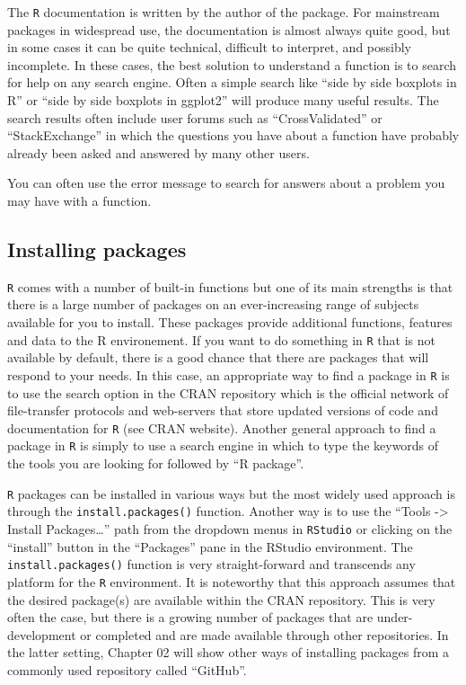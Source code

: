 \documentclass[]{book}
\theoremstyle{definition}
\theoremstyle{definition}
\theoremstyle{remark}
\let\BeginKnitrBlock\begin \let\EndKnitrBlock\end
\begin{document}
The \texttt{R} documentation is written by the author of the package.
For mainstream packages in widespread use, the documentation is almost
always quite good, but in some cases it can be quite technical,
difficult to interpret, and possibly incomplete. In these cases, the
best solution to understand a function is to search for help on any
search engine. Often a simple search like ``side by side boxplots in R''
or ``side by side boxplots in ggplot2'' will produce many useful
results. The search results often include user forums such as
``CrossValidated'' or ``StackExchange'' in which the questions you have
about a function have probably already been asked and answered by many
other users.

\BeginKnitrBlock{rmdtip}
You can often use the error message to search for answers about a
problem you may have with a function.
\EndKnitrBlock{rmdtip}

\subsection{Installing packages}\label{installing-packages}

\texttt{R} comes with a number of built-in functions but one of its main
strengths is that there is a large number of packages on an
ever-increasing range of subjects available for you to install. These
packages provide additional functions, features and data to the R
environement. If you want to do something in \texttt{R} that is not
available by default, there is a good chance that there are packages
that will respond to your needs. In this case, an appropriate way to
find a package in \texttt{R} is to use the search option in the CRAN
repository which is the official network of file-transfer protocols and
web-servers that store updated versions of code and documentation for
\texttt{R} (see CRAN website). Another general approach to find a
package in \texttt{R} is simply to use a search engine in which to type
the keywords of the tools you are looking for followed by ``R package''.

\texttt{R} packages can be installed in various ways but the most widely
used approach is through the \texttt{install.packages()} function.
Another way is to use the ``Tools -\textgreater{} Install
Packages\ldots{}'' path from the dropdown menus in \texttt{RStudio} or
clicking on the ``install'' button in the ``Packages'' pane in the
RStudio environment. The \texttt{install.packages()} function is very
straight-forward and transcends any platform for the \texttt{R}
environment. It is noteworthy that this approach assumes that the
desired package(s) are available within the CRAN repository. This is
very often the case, but there is a growing number of packages that are
under-development or completed and are made available through other
repositories. In the latter setting, Chapter 02 will show other ways of
installing packages from a commonly used repository called ``GitHub''.
\end{document}
